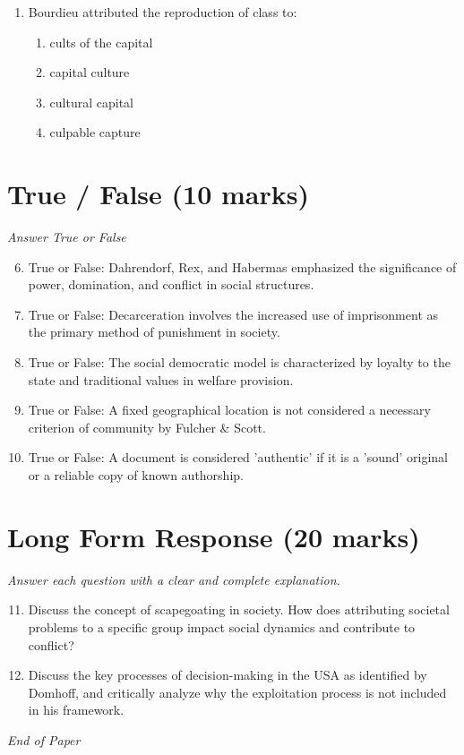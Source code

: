 \documentclass[12pt]{article}
\begin{document}
\begin{enumerate}[label=\arabic*.]
\begin{enumerate}[label=(\alph*)]
    \item ways of acting, thinking, and feeling that are collective and social in origin
    \item the way scientists construct knowledge in a social context
    \item data collected about social phenomena that are proven to be correct
    \item ideas and theories that have no basis in the external, physical world
\end{enumerate}
\item Bourdieu attributed the reproduction of class to:
\begin{enumerate}[label=(\alph*)]
    \item cults of the capital
    \item capital culture
    \item cultural capital
    \item culpable capture
\end{enumerate}
\end{enumerate}

\section*{True / False (10 marks)}
\textit{Answer True or False}
\begin{enumerate}[label=\arabic*.]
\setcounter{enumi}{5}
\item True or False: Dahrendorf, Rex, and Habermas emphasized the significance of power, domination, and conflict in social structures.
\item True or False: Decarceration involves the increased use of imprisonment as the primary method of punishment in society.
\item True or False: The social democratic model is characterized by loyalty to the state and traditional values in welfare provision.
\item True or False: A fixed geographical location is not considered a necessary criterion of community by Fulcher \& Scott.
\item True or False: A document is considered 'authentic' if it is a 'sound' original or a reliable copy of known authorship.
\end{enumerate}

\section*{Long Form Response (20 marks)}
\textit{Answer each question with a clear and complete explanation.}
\begin{enumerate}[label=\arabic*.]
\setcounter{enumi}{10}
\item Discuss the concept of scapegoating in society. How does attributing societal problems to a specific group impact social dynamics and contribute to conflict?
\item Discuss the key processes of decision-making in the USA as identified by Domhoff, and critically analyze why the exploitation process is not included in his framework.
\end{enumerate}

\vfill
\noindent\textit{End of Paper}
\end{document}
